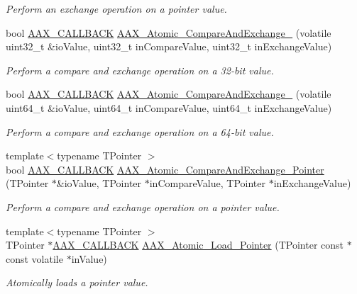 \begin{DoxyCompactItemize}
\begin{DoxyCompactList}\small\item\em Perform an exchange operation on a pointer value. \end{DoxyCompactList}\item 
bool \mbox{\hyperlink{a00392_aaa22112139aa627574b1ef562f579d43}{A\+A\+X\+\_\+\+C\+A\+L\+L\+B\+A\+CK}} \mbox{\hyperlink{a00398_a74a2bdb895976193bdfe4cd2fe31e21e}{A\+A\+X\+\_\+\+Atomic\+\_\+\+Compare\+And\+Exchange\+\_}} (volatile uint32\+\_\+t \&io\+Value, uint32\+\_\+t in\+Compare\+Value, uint32\+\_\+t in\+Exchange\+Value)
\begin{DoxyCompactList}\small\item\em Perform a compare and exchange operation on a 32-\/bit value. \end{DoxyCompactList}\item 
bool \mbox{\hyperlink{a00392_aaa22112139aa627574b1ef562f579d43}{A\+A\+X\+\_\+\+C\+A\+L\+L\+B\+A\+CK}} \mbox{\hyperlink{a00398_ae1e5b0cf8d8c7a301e13772a57a3d2fd}{A\+A\+X\+\_\+\+Atomic\+\_\+\+Compare\+And\+Exchange\+\_}} (volatile uint64\+\_\+t \&io\+Value, uint64\+\_\+t in\+Compare\+Value, uint64\+\_\+t in\+Exchange\+Value)
\begin{DoxyCompactList}\small\item\em Perform a compare and exchange operation on a 64-\/bit value. \end{DoxyCompactList}\item 
{\footnotesize template$<$typename T\+Pointer $>$ }\\bool \mbox{\hyperlink{a00392_aaa22112139aa627574b1ef562f579d43}{A\+A\+X\+\_\+\+C\+A\+L\+L\+B\+A\+CK}} \mbox{\hyperlink{a00398_ab1c7611e7c95fd61900b8e5a44c36e63}{A\+A\+X\+\_\+\+Atomic\+\_\+\+Compare\+And\+Exchange\+\_\+\+Pointer}} (T\+Pointer $\ast$\&io\+Value, T\+Pointer $\ast$in\+Compare\+Value, T\+Pointer $\ast$in\+Exchange\+Value)
\begin{DoxyCompactList}\small\item\em Perform a compare and exchange operation on a pointer value. \end{DoxyCompactList}\item 
{\footnotesize template$<$typename T\+Pointer $>$ }\\T\+Pointer $\ast$\mbox{\hyperlink{a00392_aaa22112139aa627574b1ef562f579d43}{A\+A\+X\+\_\+\+C\+A\+L\+L\+B\+A\+CK}} \mbox{\hyperlink{a00398_af4fc59eed399acba13a88ca2d46cad92}{A\+A\+X\+\_\+\+Atomic\+\_\+\+Load\+\_\+\+Pointer}} (T\+Pointer const $\ast$const volatile $\ast$in\+Value)
\begin{DoxyCompactList}\small\item\em Atomically loads a pointer value. \end{DoxyCompactList}\end{DoxyCompactItemize}


